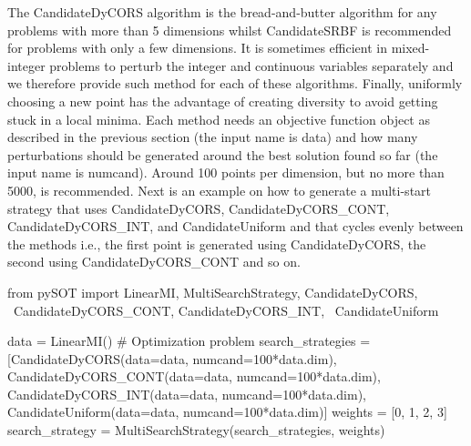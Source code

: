 \documentclass[]{article}
\begin{document}
The CandidateDyCORS algorithm is the bread-and-butter algorithm for any problems with more than 5 dimensions whilst CandidateSRBF is recommended for problems with only a few dimensions. It is sometimes efficient in mixed-integer problems to perturb the integer and continuous variables separately and we therefore provide such method for each of these algorithms. Finally, uniformly choosing a new point has the advantage of creating diversity to avoid getting stuck in a local minima. Each method needs an objective function object as described in the previous section (the input name is data) and how many perturbations should be generated around the best solution found so far (the input name is numcand). Around 100 points per dimension, but no more than 5000, is recommended. Next is an example on how to generate a multi-start strategy that uses CandidateDyCORS, CandidateDyCORS\_CONT, CandidateDyCORS\_INT, and CandidateUniform and that cycles evenly between the methods i.e., the first point is generated using CandidateDyCORS, the second using CandidateDyCORS\_CONT and so on.
\begin{python}
from pySOT import LinearMI, MultiSearchStrategy, CandidateDyCORS, \
			  CandidateDyCORS_CONT, CandidateDyCORS_INT, \
			  CandidateUniform

data = LinearMI()  # Optimization problem
search_strategies = [CandidateDyCORS(data=data, numcand=100*data.dim),
                     CandidateDyCORS_CONT(data=data, numcand=100*data.dim),
                     CandidateDyCORS_INT(data=data, numcand=100*data.dim),
                     CandidateUniform(data=data, numcand=100*data.dim)]
weights = [0, 1, 2, 3]
search_strategy = MultiSearchStrategy(search_strategies, weights)
\end{python}
\end{document}
